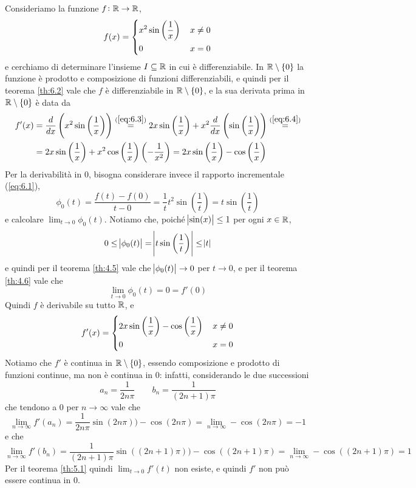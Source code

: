 \begin{example}
    Consideriamo la funzione $f\colon\amsbb{R}\to \amsbb{R}$,
    \[
    f(x) = \begin{dcases}
        x^2\sin\left(\frac{1}{x}\right)\, & x\ne 0\\
        0\, & x=0
    \end{dcases}
    \]
    e cerchiamo di determinare l'insieme $I\subseteq \amsbb{R}$ in cui è differenziabile. In $\amsbb{R}\setminus\{0\}$ la funzione è prodotto e composizione di funzioni differenziabili, e quindi per il teorema \ref{th:6.2} vale che $f$ è differenziabile in $\amsbb{R}\setminus \{0\}$, e la sua derivata prima in $\amsbb{R}\setminus\{0\}$ è data da
    \[
    \begin{split}
        f'(x) & = \frac{d}{dx}\left(x^2 \sin\left(\frac{1}{x}\right)\right) \overset{(\ref{eq:6.3})}{=} 2x\sin\left(\frac{1}{x}\right) + x^2 \frac{d}{dx}\left(\sin\left(\frac{1}{x}\right)\right) \overset{(\ref{eq:6.4})}{=} \\
        & = 2x\sin\left(\frac{1}{x}\right)+x^2 \cos\left(\frac{1}{x}\right)\left(-\frac{1}{x^2}\right) = 2x\sin\left(\frac{1}{x}\right)-\cos\left(\frac{1}{x}\right)
    \end{split}
    \]
    Per la derivabilità in $0$, bisogna considerare invece il rapporto incrementale (\ref{eq:6.1}),
    \[
    \phi_0(t) = \frac{f(t)-f(0)}{t-0} = \frac{1}{t}t^2\sin\left(\frac{1}{t}\right) = t\sin\left(\frac{1}{t}\right)
    \]
    e calcolare $\lim_{t\to 0} \phi_0(t)$. Notiamo che, poiché $\abs{\sin(x)}\le 1$ per ogni $x\in\amsbb{R}$,
    \[
    0\le \abs{\phi_0(t)}= \abs{t\sin\left(\frac{1}{t}\right)} \le \abs{t}
    \]
    e quindi per il teorema \ref{th:4.5} vale che $\abs{\phi_0(t)}\to 0$ per $t\to 0$, e per il teorema \ref{th:4.6} vale che
    \[
    \lim_{t\to 0} \phi_0(t) = 0 = f'(0)
    \]
    Quindi $f$ è derivabile su tutto $\amsbb{R}$, e
    \[
    f'(x) = \begin{dcases}
        2x\sin\left(\frac{1}{x}\right)-\cos\left(\frac{1}{x}\right)\, & x\ne 0\\
        0\, & x=0
    \end{dcases}
    \]
    Notiamo che $f'$ è continua in $\amsbb{R}\setminus\{0\}$, essendo composizione e prodotto di funzioni continue,  ma non è continua in $0$: infatti, considerando le due successioni
    \[
    a_n = \frac{1}{2n\pi} \qquad b_n = \frac{1}{(2n+1)\pi}
    \]
    che tendono a $0$ per $n\to\infty$ vale che
    \[
    \lim_{n\to\infty} f'(a_n) = \frac{1}{2n\pi}\sin(2n\pi))-\cos(2n\pi) = \lim_{n\to\infty} -\cos(2n\pi) = -1
    \]
    e che
    \[
    \lim_{n\to\infty} f'(b_n) = \frac{1}{(2n+1)\pi}\sin((2n+1)\pi))-\cos((2n+1)\pi) = \lim_{n\to\infty} -\cos((2n+1)\pi) = 1
    \]
    Per il teorema \ref{th:5.1} quindi $\lim_{t\to 0} f'(t)$ non esiste, e quindi $f'$ non può essere continua in 0.
\end{example}
